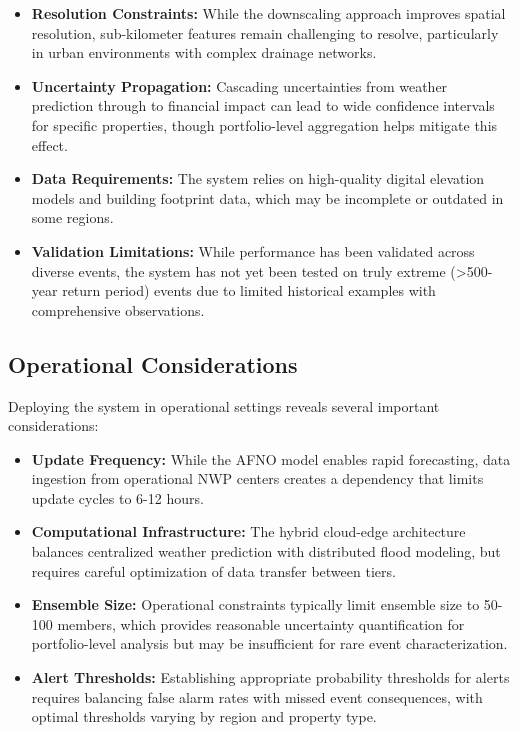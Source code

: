 \documentclass{article}
\begin{document}
\begin{itemize}
    \item \textbf{Resolution Constraints:} While the downscaling approach improves spatial resolution, sub-kilometer features remain challenging to resolve, particularly in urban environments with complex drainage networks.
    
    \item \textbf{Uncertainty Propagation:} Cascading uncertainties from weather prediction through to financial impact can lead to wide confidence intervals for specific properties, though portfolio-level aggregation helps mitigate this effect.
    
    \item \textbf{Data Requirements:} The system relies on high-quality digital elevation models and building footprint data, which may be incomplete or outdated in some regions.
    
    \item \textbf{Validation Limitations:} While performance has been validated across diverse events, the system has not yet been tested on truly extreme (>500-year return period) events due to limited historical examples with comprehensive observations.
\end{itemize}

\subsection{Operational Considerations}

Deploying the system in operational settings reveals several important considerations:

\begin{itemize}
    \item \textbf{Update Frequency:} While the AFNO model enables rapid forecasting, data ingestion from operational NWP centers creates a dependency that limits update cycles to 6-12 hours.
    
    \item \textbf{Computational Infrastructure:} The hybrid cloud-edge architecture balances centralized weather prediction with distributed flood modeling, but requires careful optimization of data transfer between tiers.
    
    \item \textbf{Ensemble Size:} Operational constraints typically limit ensemble size to 50-100 members, which provides reasonable uncertainty quantification for portfolio-level analysis but may be insufficient for rare event characterization.
    
    \item \textbf{Alert Thresholds:} Establishing appropriate probability thresholds for alerts requires balancing false alarm rates with missed event consequences, with optimal thresholds varying by region and property type.
\end{itemize}
\end{document}

